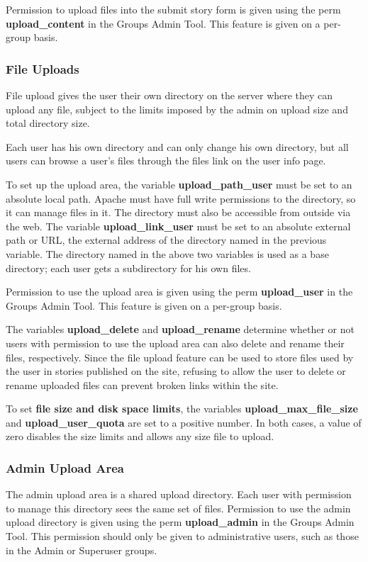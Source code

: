 Permission to upload files into the submit story form is given using the perm {\bf upload\_content} in the Groups Admin Tool. This feature is given on a per-group basis.

\subsubsection{File Uploads}

File upload gives the user their own directory on the server where they can upload any file, subject to the limits imposed by the admin on upload size and total directory size.

Each user has his own directory and can only change his own directory, but all users can browse a user's files through the files link on the user info page.

To set up the upload area, the variable {\bf upload\_path\_user} must be set to an absolute local path. Apache must have full write permissions to the directory, so it can manage files in it. The directory must also be accessible from outside via the web. The variable {\bf upload\_link\_user} must be set to an absolute external path or URL, the external address of the directory named in the previous variable. The directory named in the above two variables is used as a base directory; each user gets a subdirectory for his own files.

Permission to use the upload area is given using the perm {\bf upload\_user} in the Groups Admin Tool. This feature is given on a per-group basis.

The variables {\bf upload\_delete} and {\bf upload\_rename} determine whether or not users with permission to use the upload area can also delete and rename their files, respectively. Since the file upload feature can be used to store files used by the user in stories published on the site, refusing to allow the user to delete or rename uploaded files can prevent broken links within the site.

To set {\bf file size and disk space limits}, the variables {\bf upload\_max\_file\_size} and {\bf upload\_user\_quota} are set to a positive number. In both cases, a value of zero disables the size limits and allows any size file to upload.

\subsubsection{Admin Upload Area}

The admin upload area is a shared upload directory. Each user with permission to manage this directory sees the same set of files. Permission to use the admin upload directory is given using the perm {\bf upload\_admin} in the Groups Admin Tool. This permission should only be given to administrative users, such as those in the Admin or Superuser groups.

